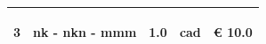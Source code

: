 \documentclass[a4paper]{article}
\begin{document}
\begin{tabular}{ | L{10mm} |  L{86mm} | L{12mm} | L{12mm} | L{16mm} | }
                                   
                                     \vspace{2.5mm}
                                     \begin{spacing}{0}
                                  3
                                     \end{spacing} &
                                     \vspace{2.5mm}
                                     \begin{spacing}{0}
                                  nk - nkn - \newline mmm
                                     \end{spacing} &
                                     \vspace{2.5mm}
                                     \begin{spacing}{0}
                                  1.0
                                     \end{spacing} &
                                     \vspace{2.5mm}
                                     \begin{spacing}{0}
                                  cad
                                     \end{spacing} &
                                     \vspace{2.5mm}
                                     \begin{spacing}{0}
                                       \euro\hfill 
                                   10.0
                                     \end{spacing} \\
                                     \hline
    

\end{tabular}
\end{document}
